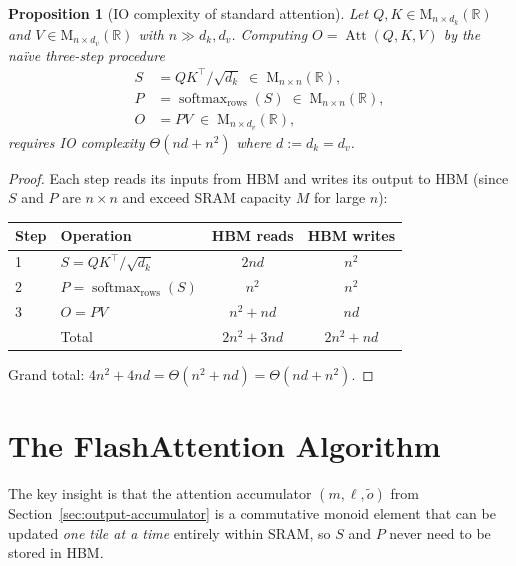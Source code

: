 \documentclass[11pt]{amsart}
\theoremstyle{plain}
\newtheorem{proposition}[theorem]{Proposition}
\theoremstyle{definition}
\newcommand{\R}{\mathbb{R}}
\newcommand{\Mat}[2]{\mathrm{M}_{#1 \times #2}(\R)}
\newcommand{\softmax}{\operatorname{softmax}}
\newcommand{\Att}{\operatorname{Att}}
\begin{document}
\begin{proposition}[IO complexity of standard attention]
\label{prop:standard-io}
Let $Q, K \in \Mat{n}{d_k}$ and $V \in \Mat{n}{d_v}$ with $n \gg d_k, d_v$.
Computing $O = \Att(Q,K,V)$ by the na\"ive three-step procedure
\begin{align*}
    S &= Q K^\top / \sqrt{d_k} \;\in\; \Mat{n}{n}, \\
    P &= \softmax_{\mathrm{rows}}(S) \;\in\; \Mat{n}{n}, \\
    O &= P V \;\in\; \Mat{n}{d_v},
\end{align*}
requires IO complexity $\Theta(nd + n^2)$ where $d := d_k = d_v$.
\end{proposition}
\begin{proof}
Each step reads its inputs from HBM and writes its output to HBM (since
$S$ and $P$ are $n\times n$ and exceed SRAM capacity $M$ for large $n$):
\begin{center}
\renewcommand{\arraystretch}{1.2}
\begin{tabular}{llcc}
\hline
Step & Operation & HBM reads & HBM writes \\
\hline
1 & $S = QK^\top/\sqrt{d_k}$ & $2nd$ & $n^2$ \\
2 & $P = \softmax_{\mathrm{rows}}(S)$ & $n^2$ & $n^2$ \\
3 & $O = PV$ & $n^2 + nd$ & $nd$ \\
\hline
  & Total & $2n^2 + 3nd$ & $2n^2 + nd$ \\
\hline
\end{tabular}
\end{center}
Grand total: $4n^2 + 4nd = \Theta(n^2 + nd) = \Theta(nd + n^2)$.
\end{proof}

\section{The FlashAttention Algorithm}
\label{sec:flashattention-alg}

The key insight is that the attention accumulator $(m,\ell,\tilde{o})$ from
Section~\ref{sec:output-accumulator} is a commutative monoid element that can
be updated \emph{one tile at a time} entirely within SRAM, so $S$ and $P$
never need to be stored in HBM.
\end{document}
